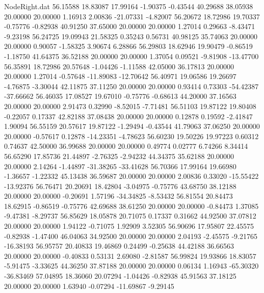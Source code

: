 \begin{filecontents}{NodeRight.dat}
  56.15588   18.83087   17.99164    -1.90375   -0.43544   40.29688   38.05938   20.00000   20.00000    1.16913    2.00836  -21.07331   -4.82007
  56.20672   18.72986   19.70337    -0.75776   -0.82938   40.91250   37.65000   20.00000   20.00000    1.27014    0.29663   -8.43471   -9.23198
  56.24725   19.09943   21.58325     0.35243    0.56731   40.98125   35.74063   20.00000   20.00000    0.90057   -1.58325    3.90674    6.28866
  56.29803   18.62946   19.90479    -0.86519   -1.18750   41.64375   36.52188   20.00000   20.00000    1.37054    0.09521   -9.81908  -13.47700
  56.35891   18.72986   20.57648    -1.04426   -1.11588   42.05000   36.17813   20.00000   20.00000    1.27014   -0.57648  -11.89083  -12.70642
  56.40971   19.06586   19.26697    -4.76875   -3.30044   42.11875   37.11250   20.00000   20.00000    0.93414    0.73303  -54.42387  -37.66662
  56.46035   17.08527   19.67010    -0.75776   -0.68613   44.20000   37.16563   20.00000   20.00000    2.91473    0.32990   -8.52015   -7.71481
  56.51103   19.87122   19.80408    -0.22057    0.17337   42.82188   37.08438   20.00000   20.00000    0.12878    0.19592   -2.41847    1.90094
  56.55159   20.57617   19.87122    -1.29494   -0.43544   41.79063   37.06250   20.00000   20.00000   -0.57617    0.12878  -14.23351   -4.78623
  56.60230   19.50226   19.97223     0.60312    0.74637   42.50000   36.99688   20.00000   20.00000    0.49774    0.02777    6.74266    8.34414
  56.65290   17.85736   21.44897    -2.76325   -2.94232   44.34375   35.62188   20.00000   20.00000    2.14264   -1.44897  -31.38265  -33.41628
  56.70366   17.99164   19.66980    -1.36657   -1.22332   45.13438   36.59687   20.00000   20.00000    2.00836    0.33020  -15.55422  -13.92376
  56.76471   20.20691   18.42804    -3.04975   -0.75776   43.68750   38.12188   20.00000   20.00000   -0.20691    1.57196  -34.34825   -8.53432
  56.81554   20.84473   18.62915    -0.86519   -0.75776   42.69688   38.61250   20.00000   20.00000   -0.84473    1.37085   -9.47381   -8.29737
  56.85629   18.05878   20.71075     0.17337    0.31662   44.92500   37.07812   20.00000   20.00000    1.94122   -0.71075    1.92909    3.52305
  56.90696   17.95807   22.45575    -0.82938   -1.47400   46.04063   34.92500   20.00000   20.00000    2.04193   -2.45575   -9.21765  -16.38193
  56.95757   20.40833   19.46869     0.24499   -0.25638   44.42188   36.66563   20.00000   20.00000   -0.40833    0.53131    2.69080   -2.81587
  56.99824   19.93866   18.83057    -5.91475   -3.33625   44.36250   37.87188   20.00000   20.00000    0.06134    1.16943  -65.30320  -36.83469
  57.04895   18.36060   20.07294    -1.04426   -0.82938   45.91563   37.18125   20.00000   20.00000    1.63940   -0.07294  -11.69867   -9.29145

\end{filecontents}
